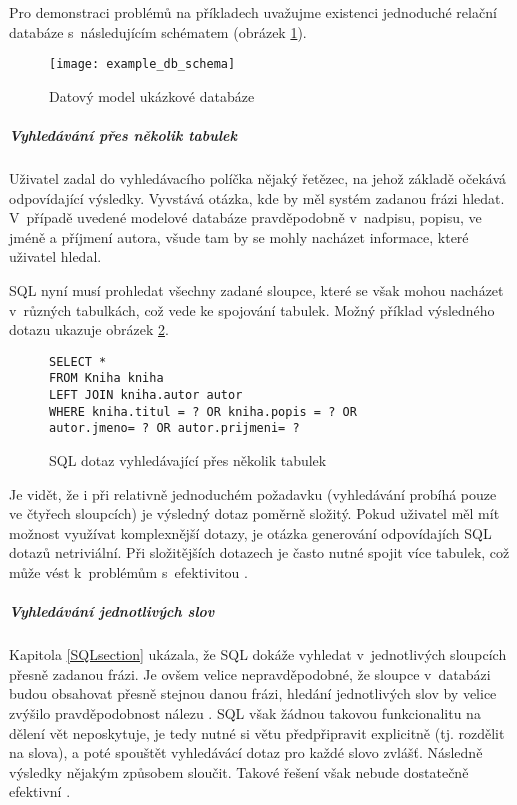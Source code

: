 \documentclass[11pt,oneside]{fithesis2}
\begin{document}
Pro demonstraci problémů na příkladech uvažujme existenci jednoduché relační databáze s~následujícím schématem (obrázek \ref{example_schema}).

\begin{figure}[htbp]
	\begin{center}
		\texttt{[image: example\_db\_schema]}
	\end{center}
	\caption{Datový model ukázkové databáze}	
	\label{example_schema}
\end{figure}

\subparagraph{Vyhledávání přes několik tabulek}
Uživatel zadal do vyhledávacího políčka nějaký řetězec, na jehož základě očekává odpovídající výsledky. Vyvstává otázka, kde by měl systém zadanou frázi hledat. V~případě uvedené modelové databáze pravděpodobně v~nadpisu, popisu, ve jméně a příjmení autora, všude tam by se mohly nacházet informace, které uživatel hledal. 

SQL nyní musí prohledat všechny zadané sloupce, které se však mohou nacházet v~různých tabulkách, což vede ke spojování tabulek. Možný příklad výsledného dotazu ukazuje obrázek \ref{SQLexample3}.
\begin{figure}[h!]
\begin{lstlisting}[frame=single]
SELECT *
FROM Kniha kniha 
LEFT JOIN kniha.autor autor 
WHERE kniha.titul = ? OR kniha.popis = ? OR 
autor.jmeno= ? OR autor.prijmeni= ?
\end{lstlisting}
\caption{SQL dotaz vyhledávající přes několik tabulek}
\label{SQLexample3}
\end{figure}

Je vidět, že i při relativně jednoduchém požadavku (vyhledávání probíhá pouze ve čtyřech sloupcích) je výsledný dotaz poměrně složitý. Pokud uživatel měl mít možnost využívat komplexnější
dotazy, je otázka generování odpovídajích SQL dotazů netriviální. Při složitějších dotazech je často nutné spojit více tabulek, což může vést k~problémům s~efektivitou \cite[s.~9]{HibernateSearchAction}.

\subparagraph{Vyhledávání jednotlivých slov}
Kapitola \ref{SQLsection} ukázala, že SQL dokáže vyhledat v~jednotlivých sloupcích přesně zadanou frázi. Je ovšem velice nepravděpodobné, že sloupce v~databázi budou obsahovat přesně stejnou danou frázi, 
hledání jednotlivých slov by velice zvýšilo pravděpodobnost nálezu \cite[s.~9]{HibernateSearchAction}. SQL však žádnou takovou funkcionalitu na dělení vět neposkytuje, je tedy nutné si větu předpřipravit explicitně (tj. rozdělit na slova),
a poté spouštět vyhledávácí dotaz pro každé slovo zvlášť. Následně výsledky nějakým způsobem sloučit. Takové řešení však nebude dostatečně efektivní \cite[s.~10]{HibernateSearchAction}. 
\end{document}
